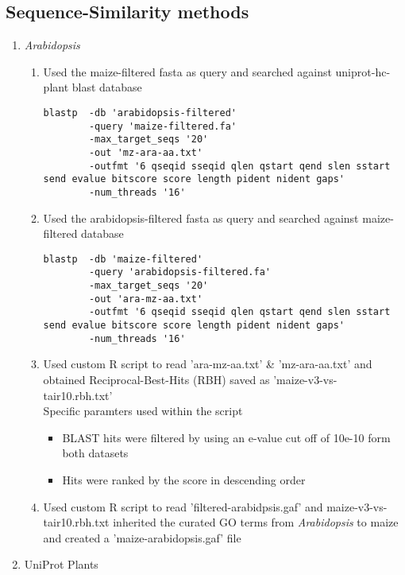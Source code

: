 \documentclass[11pt,letterpaper]{article}
\begin{document}
  \subsection{Sequence-Similarity methods}
  \begin{enumerate}
    \item \emph{Arabidopsis}
    \begin{enumerate}
      \item Used the maize-filtered fasta as query and searched against uniprot-hc-plant blast database
      \begin{verbatim}
blastp  -db 'arabidopsis-filtered'
        -query 'maize-filtered.fa'
        -max_target_seqs '20'
        -out 'mz-ara-aa.txt'
        -outfmt '6 qseqid sseqid qlen qstart qend slen sstart send evalue bitscore score length pident nident gaps'
        -num_threads '16'
      \end{verbatim}
      \item Used the arabidopsis-filtered fasta as query and searched against maize-filtered database
      \begin{verbatim}
blastp  -db 'maize-filtered'
        -query 'arabidopsis-filtered.fa'
        -max_target_seqs '20'
        -out 'ara-mz-aa.txt'
        -outfmt '6 qseqid sseqid qlen qstart qend slen sstart send evalue bitscore score length pident nident gaps'
        -num_threads '16'
      \end{verbatim}
      \item Used custom R script to read 'ara-mz-aa.txt' \& 'mz-ara-aa.txt' and obtained Reciprocal-Best-Hits (RBH) saved as 'maize-v3-vs-tair10.rbh.txt' \\
          Specific paramters used within the script
        \begin{itemize}
          \item BLAST hits were filtered by using an e-value cut off of 10e-10 form both datasets
          \item Hits were ranked by the score in descending order
        \end{itemize}
      \item Used custom R script to read 'filtered-arabidpsis.gaf' and maize-v3-vs-tair10.rbh.txt inherited the curated GO terms from \emph{Arabidopsis} to maize and created a 'maize-arabidopsis.gaf' file
    \end{enumerate}
    \item UniProt Plants
    \begin{enumerate}

\end{enumerate}
\end{enumerate}
\end{document}
